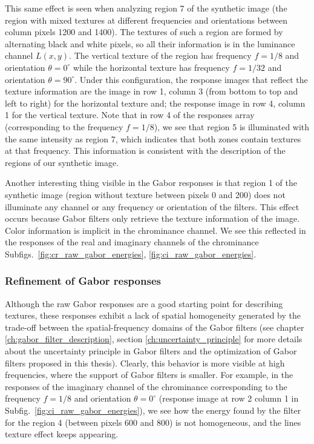 This same effect is seen when analyzing region 7 of the synthetic image (the region with mixed textures at different frequencies and orientations between column pixels 1200 and 1400). The textures of such a region are formed by alternating black and white pixels, so all their information is in the luminance channel $L(x, y)$. The vertical texture of the region has frequency $f = 1/8$ and orientation $\theta = 0^\circ$ while the horizontal texture has frequency $f = 1/32$ and orientation $\theta = 90^\circ$. Under this configuration, the response images that reflect the texture information are the image in row 1, column 3  (from bottom to top and left to right) for the horizontal texture and; the response image in row 4, column 1 for the vertical texture. Note that in row 4 of the responses array (corresponding to the frequency $f = 1/8$), we see that region 5 is illuminated with the same intensity as region 7, which indicates that both zones contain textures at that frequency. This information is consistent with the description of the regions of our synthetic image.

Another interesting thing visible in the Gabor responses is that region 1 of the synthetic image (region without texture between pixels 0 and 200) does not illuminate any channel or any frequency or orientation of the filters. This effect occurs because Gabor filters only retrieve the texture information of the image. Color information is implicit in the chrominance channel. We see this reflected in the responses of the real and imaginary channels of the chrominance Subfigs.\ \ref{fig:cr_raw_gabor_energies}, \ref{fig:ci_raw_gabor_energies}. 


\subsubsection{Refinement of Gabor responses}

Although the raw Gabor responses are a good starting point for describing textures, these responses exhibit a lack of spatial homogeneity generated by the trade-off between the spatial-frequency domains of the Gabor filters (see chapter \ref{ch:gabor_filter_description}, section \ref{ch:uncertainty_principle} for more details about the uncertainty principle in Gabor filters and the optimization of  Gabor filters proposed in this thesis). Clearly, this behavior is more visible at high frequencies, where the support of Gabor filters is smaller. For example, in the responses of the imaginary channel of the chrominance corresponding to the frequency $f=1/8$ and orientation $\theta = 0^\circ$ (response image at row 2 column 1 in Subfig.\ \ref{fig:ci_raw_gabor_energies}), we see how the energy found by the filter for the region 4 (between pixels 600 and 800) is not homogeneous, and the lines texture effect keeps appearing.


